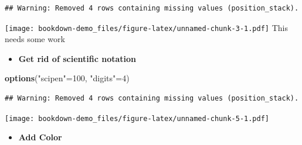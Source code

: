 \documentclass[]{book}
\newenvironment{Shaded}{\begin{snugshade}}{\end{snugshade}}
\newcommand{\DataTypeTok}[1]{\textcolor[rgb]{0.13,0.29,0.53}{#1}}
\newcommand{\DecValTok}[1]{\textcolor[rgb]{0.00,0.00,0.81}{#1}}
\newcommand{\KeywordTok}[1]{\textcolor[rgb]{0.13,0.29,0.53}{\textbf{#1}}}
\newcommand{\NormalTok}[1]{#1}
\newcommand{\OperatorTok}[1]{\textcolor[rgb]{0.81,0.36,0.00}{\textbf{#1}}}
\newcommand{\StringTok}[1]{\textcolor[rgb]{0.31,0.60,0.02}{#1}}
\providecommand{\tightlist}{%
  \setlength{\itemsep}{0pt}\setlength{\parskip}{0pt}}
\begin{document}
\begin{verbatim}
## Warning: Removed 4 rows containing missing values (position_stack).
\end{verbatim}

\texttt{[image: bookdown-demo\_files/figure-latex/unnamed-chunk-3-1.pdf]}
This needs some work

\begin{itemize}
\tightlist
\item
  \textbf{Get rid of scientific notation}
\end{itemize}

\begin{Shaded}
\begin{Highlighting}[]
\KeywordTok{options}\NormalTok{(}\StringTok{"scipen"}\NormalTok{=}\DecValTok{100}\NormalTok{, }\StringTok{"digits"}\NormalTok{=}\DecValTok{4}\NormalTok{)}
\end{Highlighting}
\end{Shaded}

\begin{Shaded}
\end{Shaded}

\begin{verbatim}
## Warning: Removed 4 rows containing missing values (position_stack).
\end{verbatim}

\texttt{[image: bookdown-demo\_files/figure-latex/unnamed-chunk-5-1.pdf]}

\begin{itemize}
\tightlist
\item
  \textbf{Add Color}
\end{itemize}
\end{document}
